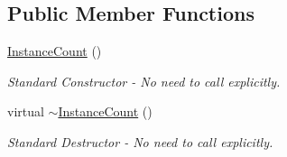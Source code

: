 \subsection*{Public Member Functions}
\begin{DoxyCompactItemize}
\item 
\hyperlink{struct_d_d4hep_1_1_instance_count_aa543483ba37302ae1a2059eceb12c798}{InstanceCount} ()
\begin{DoxyCompactList}\small\item\em Standard Constructor -\/ No need to call explicitly. \item\end{DoxyCompactList}\item 
virtual \hyperlink{struct_d_d4hep_1_1_instance_count_a7d9ff65ecca8d6024f7275ea93058ad7}{$\sim$InstanceCount} ()
\begin{DoxyCompactList}\small\item\em Standard Destructor -\/ No need to call explicitly. \item\end{DoxyCompactList}\end{DoxyCompactItemize}
